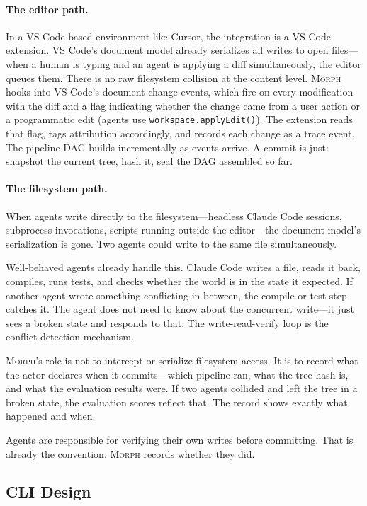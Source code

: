 \documentclass{article}
\begin{document}
\paragraph{The editor path.}
In a VS Code-based environment like Cursor, the integration is a VS Code
extension. VS Code's document model already serializes all writes to open
files---when a human is typing and an agent is applying a diff simultaneously,
the editor queues them. There is no raw filesystem collision at the content
level. \textsc{Morph} hooks into VS Code's document change events, which fire
on every modification with the diff and a flag indicating whether the change
came from a user action or a programmatic edit (agents use
\texttt{workspace.applyEdit()}). The extension reads that flag, tags attribution
accordingly, and records each change as a trace event. The pipeline DAG builds
incrementally as events arrive. A commit is just: snapshot the current tree,
hash it, seal the DAG assembled so far.

\paragraph{The filesystem path.}
When agents write directly to the filesystem---headless Claude Code sessions,
subprocess invocations, scripts running outside the editor---the document
model's serialization is gone. Two agents could write to the same file
simultaneously.

Well-behaved agents already handle this. Claude Code writes a
file, reads it back, compiles, runs tests, and checks whether the world is in
the state it expected. If another agent wrote something conflicting in between,
the compile or test step catches it. The agent does not need to know about the
concurrent write---it just sees a broken state and responds to that. The
write-read-verify loop is the conflict detection mechanism.

\textsc{Morph}'s role is not to intercept or serialize filesystem access.
It is to record what the actor declares when it commits---which pipeline ran,
what the tree hash is, and what the evaluation results were. If two agents
collided and left the tree in a broken state, the evaluation scores reflect
that. The record shows exactly what happened and when.

Agents are responsible for verifying their own writes before committing. That
is already the convention. \textsc{Morph} records whether they did.



\subsection{CLI Design}
\end{document}
